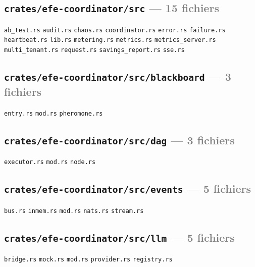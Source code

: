 \documentclass[10pt]{report}
\newcommand{\code}[1]{\texttt{\small #1}}
\begin{document}
\subsection*{\code{crates/efe-coordinator/src} \normalfont\textcolor{grey}{--- 15 fichiers}}
\begin{sloppypar}\footnotesize\raggedright
\code{ab\_test.rs} \;\textbullet\; \code{audit.rs} \;\textbullet\; \code{chaos.rs} \;\textbullet\; \code{coordinator.rs} \;\textbullet\; \code{error.rs} \;\textbullet\; \code{failure.rs} \;\textbullet\; \code{heartbeat.rs} \;\textbullet\; \code{lib.rs} \;\textbullet\; \code{metering.rs} \;\textbullet\; \code{metrics.rs} \;\textbullet\; \code{metrics\_server.rs} \;\textbullet\; \code{multi\_tenant.rs} \;\textbullet\; \code{request.rs} \;\textbullet\; \code{savings\_report.rs} \;\textbullet\; \code{sse.rs}
\end{sloppypar}

\subsection*{\code{crates/efe-coordinator/src/blackboard} \normalfont\textcolor{grey}{--- 3 fichiers}}
\begin{sloppypar}\footnotesize\raggedright
\code{entry.rs} \;\textbullet\; \code{mod.rs} \;\textbullet\; \code{pheromone.rs}
\end{sloppypar}

\subsection*{\code{crates/efe-coordinator/src/dag} \normalfont\textcolor{grey}{--- 3 fichiers}}
\begin{sloppypar}\footnotesize\raggedright
\code{executor.rs} \;\textbullet\; \code{mod.rs} \;\textbullet\; \code{node.rs}
\end{sloppypar}

\subsection*{\code{crates/efe-coordinator/src/events} \normalfont\textcolor{grey}{--- 5 fichiers}}
\begin{sloppypar}\footnotesize\raggedright
\code{bus.rs} \;\textbullet\; \code{inmem.rs} \;\textbullet\; \code{mod.rs} \;\textbullet\; \code{nats.rs} \;\textbullet\; \code{stream.rs}
\end{sloppypar}

\subsection*{\code{crates/efe-coordinator/src/llm} \normalfont\textcolor{grey}{--- 5 fichiers}}
\begin{sloppypar}\footnotesize\raggedright
\code{bridge.rs} \;\textbullet\; \code{mock.rs} \;\textbullet\; \code{mod.rs} \;\textbullet\; \code{provider.rs} \;\textbullet\; \code{registry.rs}
\end{sloppypar}
\end{document}
